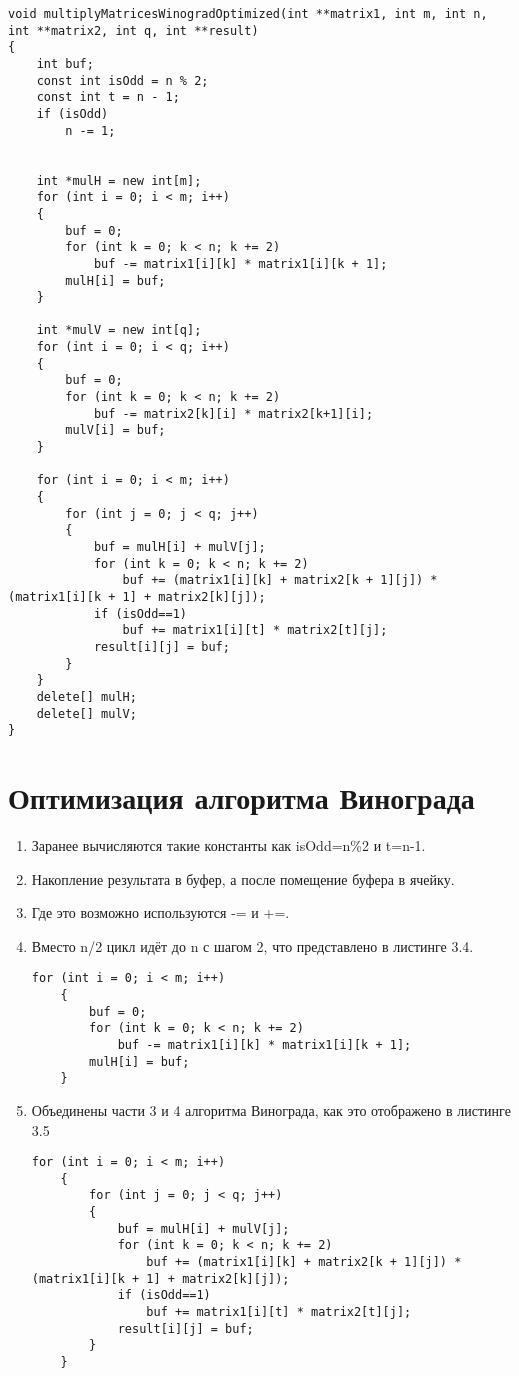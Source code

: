 \begin{lstlisting}[caption= Улучшенный алгоритм матриц Винограда]
void multiplyMatricesWinogradOptimized(int **matrix1, int m, int n, int **matrix2, int q, int **result)
{
	int buf;
	const int isOdd = n % 2;
	const int t = n - 1;
	if (isOdd)
		n -= 1;
	
	
	int *mulH = new int[m];
	for (int i = 0; i < m; i++)
	{
		buf = 0;
		for (int k = 0; k < n; k += 2)
			buf -= matrix1[i][k] * matrix1[i][k + 1];
		mulH[i] = buf;
	}
	
	int *mulV = new int[q];
	for (int i = 0; i < q; i++)
	{
		buf = 0;
		for (int k = 0; k < n; k += 2)
			buf -= matrix2[k][i] * matrix2[k+1][i];
		mulV[i] = buf;
	}
	
	for (int i = 0; i < m; i++)
	{
		for (int j = 0; j < q; j++)
		{
			buf = mulH[i] + mulV[j];
			for (int k = 0; k < n; k += 2)
				buf += (matrix1[i][k] + matrix2[k + 1][j]) * (matrix1[i][k + 1] + matrix2[k][j]);
			if (isOdd==1)
				buf += matrix1[i][t] * matrix2[t][j];
			result[i][j] = buf;
		}
	}
	delete[] mulH;
	delete[] mulV;  
}
\end{lstlisting}

\section{Оптимизация алгоритма Винограда}
\begin{enumerate}[1.]
	\item Заранее вычисляются такие константы как isOdd=n\%2 и t=n-1.
	\item Накопление результата в буфер, а после помещение буфера в ячейку.
	\item Где это возможно используются -= и +=.
	\item Вместо n/2 цикл идёт до n с шагом 2, что представлено в листинге 3.4.
	\begin{lstlisting}[caption=Оптимизации алгоритма Винограда \textnumero 2--4]
	for (int i = 0; i < m; i++)
	{
		buf = 0;
		for (int k = 0; k < n; k += 2)
			buf -= matrix1[i][k] * matrix1[i][k + 1];
		mulH[i] = buf;
	}
	\end{lstlisting}
	\item Объединены части 3 и 4 алгоритма Винограда, как это отображено в листинге 3.5
	\begin{lstlisting}[caption=Оптимизация алгоритма Винограда \textnumero 5]
	for (int i = 0; i < m; i++)
	{
		for (int j = 0; j < q; j++)
		{
			buf = mulH[i] + mulV[j];
			for (int k = 0; k < n; k += 2)
				buf += (matrix1[i][k] + matrix2[k + 1][j]) * (matrix1[i][k + 1] + matrix2[k][j]);
			if (isOdd==1)
				buf += matrix1[i][t] * matrix2[t][j];
			result[i][j] = buf;
		}
	}
	\end{lstlisting}
\end{enumerate}

